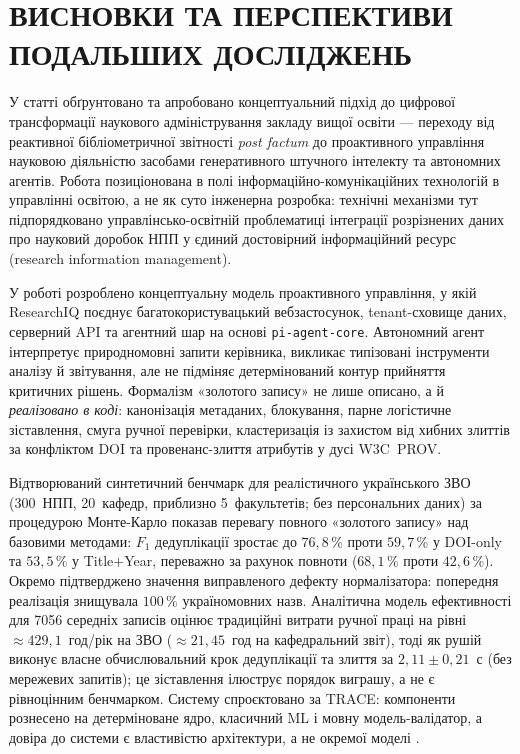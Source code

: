 \section*{ВИСНОВКИ ТА ПЕРСПЕКТИВИ ПОДАЛЬШИХ ДОСЛІДЖЕНЬ}

У статті обґрунтовано та апробовано концептуальний підхід до цифрової трансформації наукового адміністрування закладу вищої освіти --- переходу від реактивної бібліометричної звітності \emph{post factum} до проактивного управління науковою діяльністю засобами генеративного штучного інтелекту та автономних агентів. Робота позиціонована в полі інформаційно-комунікаційних технологій в управлінні освітою, а не як суто інженерна розробка: технічні механізми тут підпорядковано управлінсько-освітній проблематиці інтеграції розрізнених даних про науковий доробок НПП у єдиний достовірний інформаційний ресурс (research information management).

У роботі розроблено концептуальну модель проактивного управління, у якій ResearchIQ поєднує багатокористувацький вебзастосунок, tenant-сховище даних, серверний API та агентний шар на основі \texttt{pi-agent-core}. Автономний агент інтерпретує природномовні запити керівника, викликає типізовані інструменти аналізу й звітування, але не підміняє детермінований контур прийняття критичних рішень. Формалізм «золотого запису» не лише описано, а й \emph{реалізовано в коді}: канонізація метаданих, блокування, парне логістичне зіставлення, смуга ручної перевірки, кластеризація із захистом від хибних злиттів за конфліктом DOI та провенанс-злиття атрибутів у дусі W3C~PROV.

Відтворюваний синтетичний бенчмарк для реалістичного українського ЗВО (300~НПП, 20~кафедр, приблизно 5~факультетів; без персональних даних) за процедурою Монте-Карло показав перевагу повного «золотого запису» над базовими методами: $F_1$ дедуплікації зростає до $76{,}8\,\%$ проти $59{,}7\,\%$ у DOI-only та $53{,}5\,\%$ у Title$+$Year, переважно за рахунок повноти ($68{,}1\,\%$ проти $42{,}6\,\%$). Окремо підтверджено значення виправленого дефекту нормалізатора: попередня реалізація знищувала $100\,\%$ україномовних назв. Аналітична модель ефективності для 7056 середніх записів оцінює традиційні витрати ручної праці на рівні $\approx 429{,}1$~год/рік на ЗВО ($\approx 21{,}45$~год на кафедральний звіт), тоді як рушій виконує власне обчислювальний крок дедуплікації та злиття за $2{,}11 \pm 0{,}21$~с (без мережевих запитів); це зіставлення ілюструє порядок виграшу, а не є рівноцінним бенчмарком. Систему спроєктовано за TRACE: компоненти рознесено на детерміноване ядро, класичний ML і мовну модель-валідатор, а довіра до системи є властивістю архітектури, а не окремої моделі \cite{Zabolotnii2026TRACE}.

